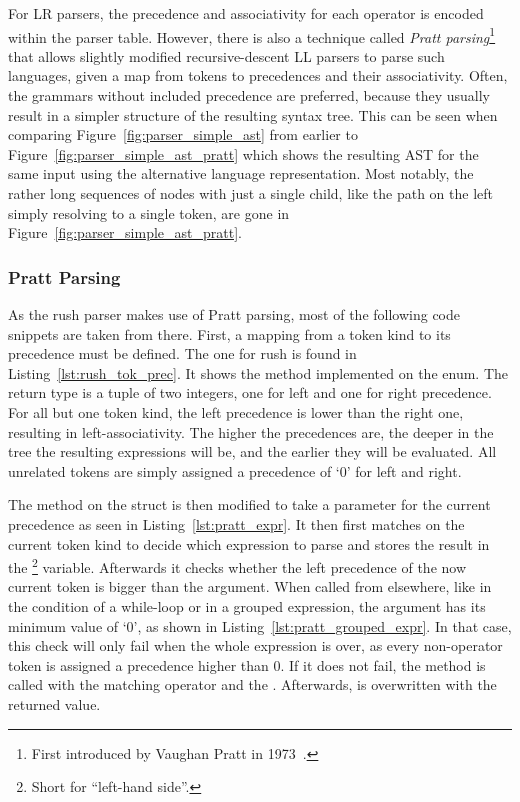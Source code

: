 For LR parsers, the precedence and associativity for each operator is encoded within the parser table.
However, there is also a technique called \emph{Pratt parsing}\footnote{First introduced by Vaughan Pratt in 1973~\cite{Pratt1973}.} that allows slightly modified recursive-descent LL parsers to parse such languages, given a map from tokens to precedences and their associativity.
Often, the grammars without included precedence are preferred, because they usually result in a simpler structure of the resulting syntax tree.
This can be seen when comparing Figure~\ref{fig:parser_simple_ast} from earlier to Figure~\ref{fig:parser_simple_ast_pratt} which shows the resulting AST for the same input using the alternative language representation.
Most notably, the rather long sequences of nodes with just a single child, like the path on the left simply resolving to a single  token, are gone in Figure~\ref{fig:parser_simple_ast_pratt}.

\subsubsection{Pratt Parsing}

As the rush parser makes use of Pratt parsing, most of the following code snippets are taken from there.
First, a mapping from a token kind to its precedence must be defined.
The one for rush is found in Listing~\ref{lst:rush_tok_prec}.
It shows the  method implemented on the  enum.
The return type is a tuple of two integers, one for left and one for right precedence.
For all but one token kind, the left precedence is lower than the right one, resulting in left-associativity.
The higher the precedences are, the deeper in the tree the resulting expressions will be, and the earlier they will be evaluated.
All unrelated tokens are simply assigned a precedence of `0' for left and right.


The  method on the  struct is then modified to take a parameter for the current precedence as seen in Listing~\ref{lst:pratt_expr}.
It then first matches on the current token kind to decide which expression to parse and stores the result in the \footnote{Short for \enquote{left-hand side}.} variable.
Afterwards it checks whether the left precedence of the now current token is bigger than the  argument.
When called from elsewhere, like in the condition of a while-loop or in a grouped expression, the  argument has its minimum value of `0', as shown in Listing~\ref{lst:pratt_grouped_expr}.
In that case, this check will only fail when the whole expression is over, as every non-operator token is assigned a precedence higher than 0.
If it does not fail, the  method is called with the matching operator and the .
Afterwards,  is overwritten with the returned value.


